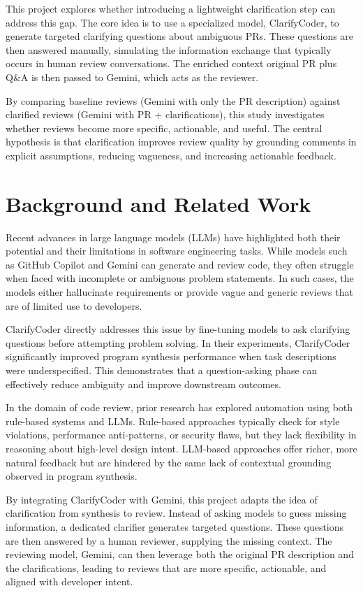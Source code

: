 \documentclass[conference]{IEEEtran}
\begin{document}
This project explores whether introducing a lightweight clarification step can address this gap. The core idea is to use a specialized model, ClarifyCoder, to generate targeted clarifying questions about ambiguous PRs. These questions are then answered manually, simulating the information exchange that typically occurs in human review conversations. The enriched context original PR plus Q\&A is then passed to Gemini, which acts as the reviewer.

By comparing baseline reviews (Gemini with only the PR description) against clarified reviews (Gemini with PR + clarifications), this study investigates whether reviews become more specific, actionable, and useful. The central hypothesis is that clarification improves review quality by grounding comments in explicit assumptions, reducing vagueness, and increasing actionable feedback.

\section{Background and Related Work}
Recent advances in large language models (LLMs) have highlighted both their potential and their limitations in software engineering tasks. While models such as GitHub Copilot and Gemini can generate and review code, they often struggle when faced with incomplete or ambiguous problem statements. In such cases, the models either hallucinate requirements or provide vague and generic reviews that are of limited use to developers.

ClarifyCoder \cite{wu2025clarifycoder} directly addresses this issue by fine-tuning models to ask clarifying questions before attempting problem solving. In their experiments, ClarifyCoder significantly improved program synthesis performance when task descriptions were underspecified. This demonstrates that a question-asking phase can effectively reduce ambiguity and improve downstream outcomes.

In the domain of code review, prior research has explored automation using both rule-based systems and LLMs. Rule-based approaches typically check for style violations, performance anti-patterns, or security flaws, but they lack flexibility in reasoning about high-level design intent. LLM-based approaches offer richer, more natural feedback but are hindered by the same lack of contextual grounding observed in program synthesis. 

By integrating ClarifyCoder with Gemini, this project adapts the idea of clarification from synthesis to review. Instead of asking models to guess missing information, a dedicated clarifier generates targeted questions. These questions are then answered by a human reviewer, supplying the missing context. The reviewing model, Gemini, can then leverage both the original PR description and the clarifications, leading to reviews that are more specific, actionable, and aligned with developer intent.
\end{document}
